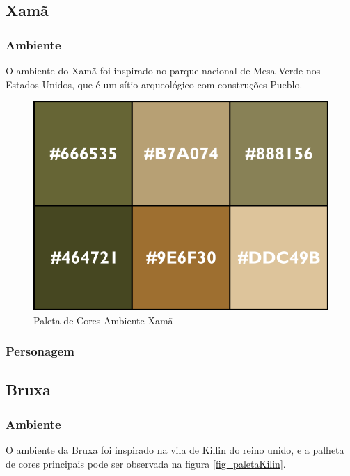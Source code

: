 \clearpage

\subsection{Xamã}

\subsubsection{Ambiente}
O ambiente do Xamã foi inspirado no parque nacional de Mesa Verde nos Estados Unidos, que é um sítio arqueológico com construções Pueblo.

\begin{figure}[htb]
	\caption{\label{fig_paletaMesa}Paleta de Cores Ambiente Xamã}
	\begin{center}
	    \includegraphics[width=\textwidth/2]{imagens/PaletaMesaVerde.png}
	\end{center}
\end{figure}




\subsubsection{Personagem}

\subsection{Bruxa}
\subsubsection{Ambiente}
O ambiente da Bruxa foi inspirado na vila de Killin do reino unido, e a palheta de cores principais pode ser observada na figura \ref{fig_paletaKilin}.


